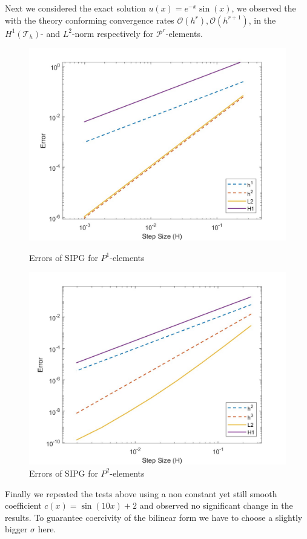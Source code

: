 Next we considered the exact solution $u(x) = e^{-x} \sin(x)$, we observed the with the theory conforming convergence rates 
$\mathcal{O}(h^r), \mathcal{O}(h^{r+1})$, in the $H^1(\mathcal{T}_h)$- and $L^2$-norm respectively for $\mathcal{P}^r$-elements.

\begin{figure}[h!]
    \centering
    
    \begin{minipage}[t]{0.48\textwidth}
        \centering
        \includegraphics[width=\linewidth]{figures/dg_elliptic_uniform_mesh_exact_sol_errors_P1.jpg}
        \caption{Errors of SIPG for $P^1$-elements}
        \label{fig:elliptic_uniform_mesh_p1}
    \end{minipage}
    \hfill
    \begin{minipage}[t]{0.48\textwidth}
        \centering
        \includegraphics[width=\linewidth]{figures/dg_elliptic_uniform_mesh_exact_sol_errors_P2.jpg}
        \caption{Errors of SIPG for $P^2$-elements}
        \label{fig:elliptic_uniform_mesh_p2}
    \end{minipage}
\end{figure}

Finally we repeated the tests above using a non constant yet still smooth coefficient $c(x) = \sin(10x) + 2$ and observed no significant change in the results. 
To guarantee coercivity of the bilinear form we have to choose a slightly bigger $\sigma$ here.

